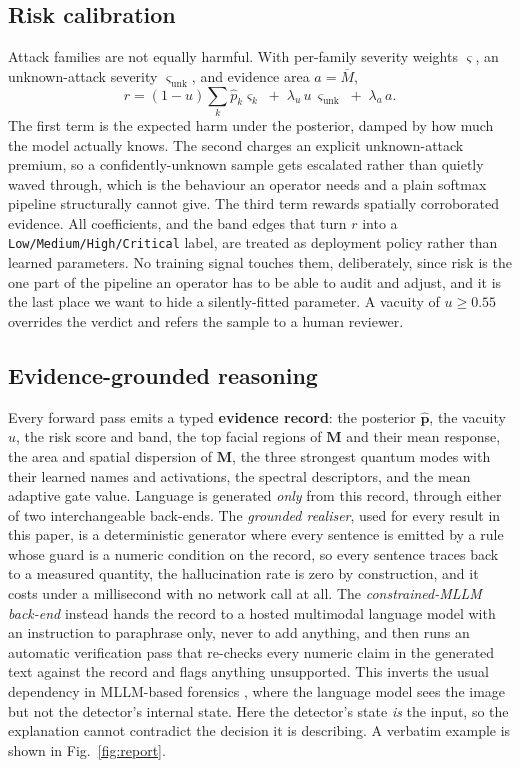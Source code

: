 \documentclass[conference]{IEEEtran}
\newcommand{\bs}[1]{\boldsymbol{#1}}
\begin{document}
\subsection{Risk calibration}
Attack families are not equally harmful. With per-family severity weights
$\bs{\varsigma}$, an unknown-attack severity $\varsigma_{\text{unk}}$, and evidence
area $a=\overline{M}$,
\begin{equation}
r = (1-u)\sum_{k}\hat{p}_{k}\varsigma_{k} \;+\; \lambda_{u}\,u\,\varsigma_{\text{unk}}
\;+\; \lambda_{a}\,a .
\label{eq:risk}
\end{equation}
The first term is the expected harm under the posterior, damped by how much the
model actually knows. The second charges an explicit unknown-attack premium, so a
confidently-unknown sample gets escalated rather than quietly waved through, which is
the behaviour an operator needs and a plain softmax pipeline structurally cannot
give. The third term rewards spatially corroborated evidence. All coefficients, and
the band edges that turn $r$ into a \texttt{Low/Medium/High/Critical} label, are
treated as deployment policy rather than learned parameters. No training signal
touches them, deliberately, since risk is the one part of the pipeline an operator
has to be able to audit and adjust, and it is the last place we want to hide a
silently-fitted parameter. A vacuity of $u\ge0.55$ overrides the verdict and refers
the sample to a human reviewer.

\subsection{Evidence-grounded reasoning}
Every forward pass emits a typed \textbf{evidence record}: the posterior
$\hat{\bs{p}}$, the vacuity $u$, the risk score and band, the top facial regions of
$\bs{M}$ and their mean response, the area and spatial dispersion of $\bs{M}$, the
three strongest quantum modes with their learned names and activations, the spectral
descriptors, and the mean adaptive gate value. Language is generated \emph{only}
from this record, through either of two interchangeable back-ends. The
\emph{grounded realiser}, used for every result in this paper, is a deterministic
generator where every sentence is emitted by a rule whose guard is a numeric
condition on the record, so every sentence traces back to a measured quantity, the
hallucination rate is zero by construction, and it costs under a millisecond with no
network call at all. The \emph{constrained-MLLM back-end} instead hands the record to
a hosted multimodal language model with an instruction to paraphrase only, never to
add anything, and then runs an automatic verification pass that re-checks every
numeric claim in the generated text against the record and flags anything
unsupported. This inverts the usual dependency in MLLM-based forensics
\cite{huang2024ffaa,guo2025m2f2det}, where the language model sees the image but not
the detector's internal state. Here the detector's state \emph{is} the input, so the
explanation cannot contradict the decision it is describing. A verbatim example is
shown in Fig.~\ref{fig:report}.
\end{document}
